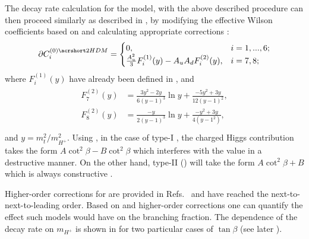 The decay rate calculation for the \TwoHDM model, with the above described procedure can then proceed similarly as described in , by modifying the effective Wilson coefficients based on  and calculating appropriate corrections \cite{Ciuchini:1997xe}:
\begin{equation}\label{eq:partial_wilson_2hdm}
    \partial C_i^{(0)\TwoHDM} = 
    \begin{cases}
        0, & i=1,...,6;\\
        \frac{A_u^2}{3}F_i^{(1)}(y) - A_uA_dF_i^{(2)}(y), & i=7,8;\\
    \end{cases}
\end{equation}
where $F_i^{(1)}(y)$ have already been defined in , and
\begin{align}
    \begin{split}
    F_7^{(2)}(y) &= \frac{3y^2-2y}{6(y-1)^3}\ln y + \frac{-5y^2+3y}{12(y-1)^2},\\
    F_8^{(2)}(y) &= \frac{-y}{2(y-1)^3}\ln y + \frac{-y^2+3y}{4(y-1^2)},\\
    \end{split}
\end{align}
and $y = m_t^2/m_{H^+}^2$.
Using , in the case of type-I \TwoHDM, the charged Higgs contribution takes the form $A\cot^2\beta-B\cot^2\beta$ which interferes with the \SM value in a destructive manner.
On the other hand, type-II \TwoHDM () will take the form $A\cot^2\beta+B$ which is always constructive \cite{Misiak:2017bgg}.

Higher-order corrections for \TwoHDM are provided in Refs.~\cite{Ciuchini:1997xe,Hermann:2012fc} and have reached the next-to-next-to-leading order.
Based on  and higher-order corrections one can quantify the effect such models would have on the \BtoXsgamma branching fraction.
The dependence of the \BtoXsgamma decay rate on $m_{H^+}$ is shown in  for two particular cases of $\tan\beta$ (see later ).

